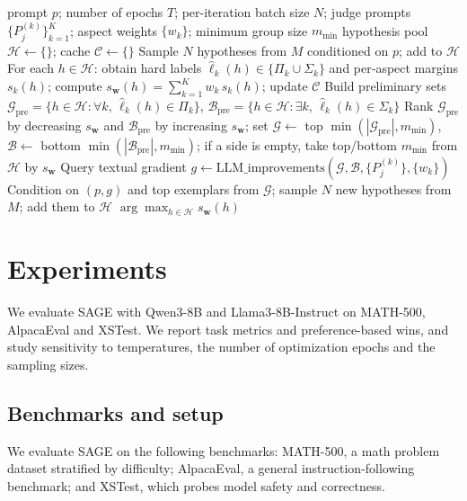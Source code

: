 \documentclass[11pt]{article}
\theoremstyle{plain}
\theoremstyle{definition}
\theoremstyle{remark}
\newcommand{\method}{SAGE}
\newcommand{\batchN}{N}
\begin{document}
\begin{algorithm}[t]
\caption{\method{}: Self-judged iterative response refinement over \(T\) epochs}
\label{alg:method}
\begin{algorithmic}
    prompt \(p\); number of epochs \(T\); per-iteration batch size \(\batchN\); judge prompts \(\{P^{(k)}_j\}_{k=1}^K\); aspect weights \(\{w_k\}\); minimum group size \(m_{\min}\)
    hypothesis pool \(\mathcal{H} \leftarrow \{\}\); cache \(\mathcal{C}\leftarrow \{\}\)
    Sample \(\batchN\) hypotheses from \(M\) conditioned on \(p\); add to \(\mathcal{H}\)
     \STATE For each \(h\in\mathcal{H}\): obtain hard labels \(\hat\ell_k(h)\in\{\Pi_k\cup\Sigma_k\}\) and per‑aspect margins \(s_k(h)\); compute \(s_{\mathbf{w}}(h)=\sum_{k=1}^K w_k\, s_k(h)\); update \(\mathcal{C}\)
     \STATE Build preliminary sets \(\mathcal{G}_{\text{pre}}=\{h\in\mathcal{H}: \forall k,\, \hat\ell_k(h)\in \Pi_k\}\), \(\mathcal{B}_{\text{pre}}=\{h\in\mathcal{H}: \exists k,\, \hat\ell_k(h)\in \Sigma_k\}\)
     \STATE Rank \(\mathcal{G}_{\text{pre}}\) by decreasing \(s_{\mathbf{w}}\) and \(\mathcal{B}_{\text{pre}}\) by increasing \(s_{\mathbf{w}}\); set \(\mathcal{G}\leftarrow\) top \(\min(|\mathcal{G}_{\text{pre}}|,m_{\min})\), \(\mathcal{B}\leftarrow\) bottom \(\min(|\mathcal{B}_{\text{pre}}|,m_{\min})\); if a side is empty, take top/bottom \(m_{\min}\) from \(\mathcal{H}\) by \(s_{\mathbf{w}}\)
     \STATE Query textual gradient \(g \leftarrow \text{LLM\_improvements}(\mathcal{G}, \mathcal{B}, \{P^{\!(k)}_j\}, \{w_k\})\)
     \STATE Condition on \((p, g)\) and top exemplars from \(\mathcal{G}\); sample \(\batchN\) new hypotheses from \(M\); add them to \(\mathcal{H}\)
   \ENDFOR
    \(\arg\max_{h\in\mathcal{H}} s_{\mathbf{w}}(h)\)
\end{algorithmic}
\end{algorithm}

\section{Experiments}
\label{sec:experiments}
We evaluate \method{} with Qwen3-8B \citep{yang2025qwen3} and Llama3-8B-Instruct \citep{grattafiori2024llama} on MATH-500, AlpacaEval and XSTest. We report task metrics and preference-based wins, and study sensitivity to temperatures, the number of optimization epochs and the sampling sizes.

\subsection{Benchmarks and setup}
We evaluate \method{} on the following benchmarks:
MATH-500, a math problem dataset stratified by difficulty; AlpacaEval, a general instruction-following benchmark; and XSTest, which probes model safety and correctness.
\end{document}
